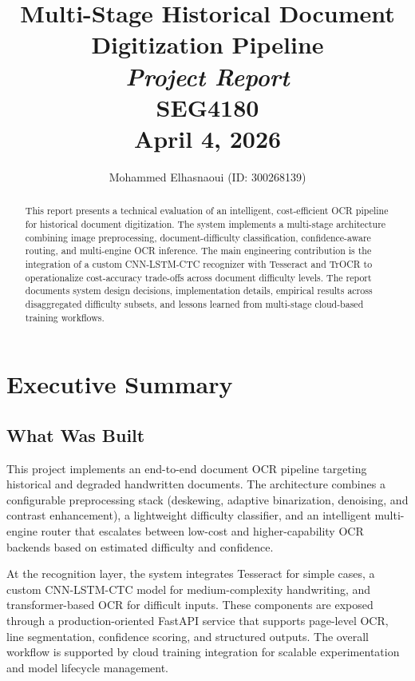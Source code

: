 \documentclass[12pt,a4paper]{article}
\title{
  \textbf{Multi-Stage Historical Document Digitization Pipeline} \\
  \large\textit{Project Report} \\
  \normalsize SEG4180 \\
  April 4, 2026
}
\author{Mohammed Elhasnaoui (ID: 300268139)}
\begin{document}
\maketitle

\begin{abstract}
This report presents a technical evaluation of an intelligent, cost-efficient
OCR pipeline for historical document digitization. The system implements a
multi-stage architecture combining image preprocessing, document-difficulty
classification, confidence-aware routing, and multi-engine OCR inference. The
main engineering contribution is the integration of a custom CNN-LSTM-CTC
recognizer with Tesseract and TrOCR to operationalize cost-accuracy
trade-offs across document difficulty levels. The report
documents system design decisions, implementation details, empirical results
across disaggregated difficulty subsets, and lessons learned from multi-stage
cloud-based training workflows.
\end{abstract}

\newpage
\tableofcontents
\newpage


\section{Executive Summary}

\subsection{What Was Built}

This project implements an end-to-end document OCR pipeline targeting
historical and degraded handwritten documents. The architecture
combines a configurable preprocessing stack (deskewing, adaptive
binarization, denoising, and contrast enhancement), a lightweight
difficulty classifier, and an intelligent multi-engine router that
escalates between low-cost and higher-capability OCR backends based
on estimated difficulty and confidence.

At the recognition layer, the system integrates Tesseract for simple
cases, a custom CNN-LSTM-CTC model for medium-complexity handwriting,
and transformer-based OCR for difficult inputs. These components are
exposed through a production-oriented FastAPI service that supports
page-level OCR, line segmentation, confidence scoring, and structured
outputs. The overall workflow is supported by cloud training
integration for scalable experimentation and model lifecycle
management.
\end{document}
